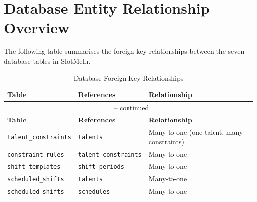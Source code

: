 \chapter{Database Entity Relationship Overview}

The following table summarises the foreign key relationships between the seven database tables in SlotMeIn.

\begin{longtable}{p{4cm} p{3.5cm} p{5cm}}
\caption{Database Foreign Key Relationships} \label{tab:fk} \\
\toprule
\textbf{Table} & \textbf{References} & \textbf{Relationship} \\
\midrule
\endfirsthead
\multicolumn{3}{c}{\tablename\ \thetable{} -- continued} \\
\toprule
\textbf{Table} & \textbf{References} & \textbf{Relationship} \\
\midrule
\endhead
\texttt{talent\_constraints} & \texttt{talents} & Many-to-one (one talent, many constraints) \\
\texttt{constraint\_rules} & \texttt{talent\_constraints} & Many-to-one \\
\texttt{shift\_templates} & \texttt{shift\_periods} & Many-to-one \\
\texttt{scheduled\_shifts} & \texttt{talents} & Many-to-one \\
\texttt{scheduled\_shifts} & \texttt{schedules} & Many-to-one \\
\bottomrule
\end{longtable}


